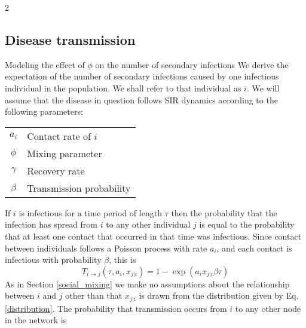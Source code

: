 \documentclass[10pt]{article}
\begin{document}
\begin{multicols}{2}
\vspace{2cm}
\subsection{Disease transmission}
\label{disease_section}
Modeling the effect of $\phi$ on the number of secondary infections
We derive the expectation of the number of secondary infections caused by one infectious individual in the population. We shall refer to that individual as $i$. We will assume that the disease in question follows SIR dynamics according to the following parameters:
\begin{center}
\begin{tabular}{c|l}
$a_{i}$& Contact rate of $i$\\
$\phi$& Mixing parameter\\
$\gamma$& Recovery rate\\
$\beta$ & Transmission probability
\end{tabular}
\end{center}
If $i$ is infectious for a time period of length $\tau$ then the probability that the infection has spread from $i$ to any other individual $j$ is equal to the probability that at least one contact that occurred in that time was infectious. Since contact between individuals follows a Poisson process with rate $a_{i}$, and each contact is infectious with probability $\beta$, this is
\begin{equation}
T_{i\rightarrow j}(\tau,a_{i},x_{j|i})=1-\exp(a_{i}x_{j|i}\beta\tau) 
\end{equation}
As in Section \ref{social_mixing} we make no assumptions about the relationship between $i$ and $j$ other than that $x_{j|i}$ is drawn from the distribution given by Eq.\eqref{distribution}. The probability that transmission occurs from $i$ to any other node in the network is
\begin{equation}

\end{equation}
\end{multicols}
\end{document}
